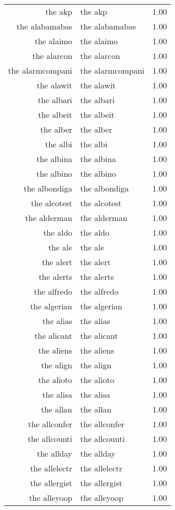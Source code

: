 \begin{table}[ht]
\begin{tabular}{rlr}
  the akp & the akp & 1.00 \\ 
  the alabamabas & the alabamabas & 1.00 \\ 
  the alaimo & the alaimo & 1.00 \\ 
  the alarcon & the alarcon & 1.00 \\ 
  the alarmcompani & the alarmcompani & 1.00 \\ 
  the alawit & the alawit & 1.00 \\ 
  the albari & the albari & 1.00 \\ 
  the albeit & the albeit & 1.00 \\ 
  the alber & the alber & 1.00 \\ 
  the albi & the albi & 1.00 \\ 
  the albina & the albina & 1.00 \\ 
  the albino & the albino & 1.00 \\ 
  the albondiga & the albondiga & 1.00 \\ 
  the alcotest & the alcotest & 1.00 \\ 
  the alderman & the alderman & 1.00 \\ 
  the aldo & the aldo & 1.00 \\ 
  the ale & the ale & 1.00 \\ 
  the alert & the alert & 1.00 \\ 
  the alerts & the alerts & 1.00 \\ 
  the alfredo & the alfredo & 1.00 \\ 
  the algerian & the algerian & 1.00 \\ 
  the alias & the alias & 1.00 \\ 
  the alicant & the alicant & 1.00 \\ 
  the aliens & the aliens & 1.00 \\ 
  the align & the align & 1.00 \\ 
  the alioto & the alioto & 1.00 \\ 
  the alisa & the alisa & 1.00 \\ 
  the allan & the allan & 1.00 \\ 
  the allconfer & the allconfer & 1.00 \\ 
  the allcounti & the allcounti & 1.00 \\ 
  the allday & the allday & 1.00 \\ 
  the allelectr & the allelectr & 1.00 \\ 
  the allergist & the allergist & 1.00 \\ 
  the alleyoop & the alleyoop & 1.00 \\ 

\end{tabular}
\end{table}
